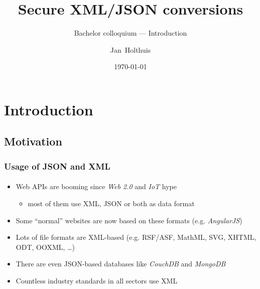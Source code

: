 \documentclass[
    alternativetitlepage=bild,
    cornerlogo=hgi_nds_logo2,
    sectionoverview,
]{rubpresentation}
\title[XML/JSON conversions]
{Secure XML/JSON conversions}
\subtitle{Bachelor colloquium --- Introduction}
\author[Holthuis]{Jan~Holthuis}
\institute[Ruhr-Uni Bochum]
{%
Chair for Net- and Data Security\\
Ruhr-University of Bochum
}
\date%
{\today}
\begin{document}
\frame[plain]{\titlepage}




\section{Introduction}


\subsection{Motivation}

\begin{frame}[plain]
    \frametitle{Usage of JSON and XML}
    \framesubtitle{}
    \begin{itemize}
        \item{} Web APIs are booming since \emph{Web 2.0} and \emph{IoT} hype
            \begin{itemize}
                \item{} most of them use XML, JSON or both as data format
            \end{itemize}
        \item{} Some \enquote{normal} websites are now based on these formats (e.g. \emph{AngularJS})\\
        \item{} Lots of file formats are XML-based (e.g. RSF/ASF, MathML, SVG, XHTML, ODT, OOXML, \ldots{})\\
        \item{} There are even JSON-based databases like \emph{CouchDB} and \emph{MongoDB}\\
        \item{} Countless industry standards in all sectors use XML
    \end{itemize}
\end{frame}
\end{document}
